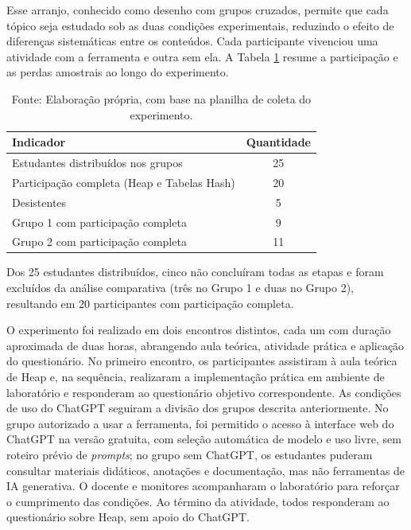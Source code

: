 Esse arranjo, conhecido como desenho com grupos cruzados, permite que cada tópico seja estudado sob as duas condições experimentais, reduzindo o efeito de diferenças sistemáticas entre os conteúdos. Cada participante vivenciou uma atividade com a ferramenta e outra sem ela. A Tabela \ref{tab:resumo-participacao} resume a participação e as perdas amostrais ao longo do experimento.

\begin{table}[!ht]
    \centering
    \caption{Resumo da participação no experimento}
    \label{tab:resumo-participacao}
    \begin{tabular}{l c}
        \hline
        \textbf{Indicador} & \textbf{Quantidade} \\
        \hline
        Estudantes distribuídos nos grupos & 25 \\
        Participação completa (Heap e Tabelas Hash) & 20 \\
        Desistentes & 5 \\
        Grupo 1 com participação completa & 9 \\
        Grupo 2 com participação completa & 11 \\
        \hline
    \end{tabular}

    \vspace{0.2cm}
    \caption*{Fonte: Elaboração própria, com base na planilha de coleta do experimento.}
\end{table}

Dos 25 estudantes distribuídos, cinco não concluíram todas as etapas e foram excluídos da análise comparativa (três no Grupo 1 e duas no Grupo 2), resultando em 20 participantes com participação completa.

O experimento foi realizado em dois encontros distintos, cada um com duração aproximada de duas horas, abrangendo aula teórica, atividade prática e aplicação do questionário. No primeiro encontro, os participantes assistiram à aula teórica de Heap e, na sequência, realizaram a implementação prática em ambiente de laboratório e responderam ao questionário objetivo correspondente. As condições de uso do ChatGPT seguiram a divisão dos grupos descrita anteriormente. No grupo autorizado a usar a ferramenta, foi permitido o acesso à interface web do ChatGPT na versão gratuita, com seleção automática de modelo e uso livre, sem roteiro prévio de \textit{prompts}; no grupo sem ChatGPT, os estudantes puderam consultar materiais didáticos, anotações e documentação, mas não ferramentas de IA generativa. O docente e monitores acompanharam o laboratório para reforçar o cumprimento das condições. Ao término da atividade, todos responderam ao questionário sobre Heap, sem apoio do ChatGPT.

